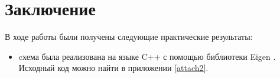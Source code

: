 \section{Заключение}
В ходе работы были получены следующие практические результаты:
\begin{itemize}
  \item cхема была реализована на языке C++ с помощью библиотеки Eigen \cite{eigenLib}.
  Исходный код можно найти в приложении \ref{attach2}.
\end{itemize}
